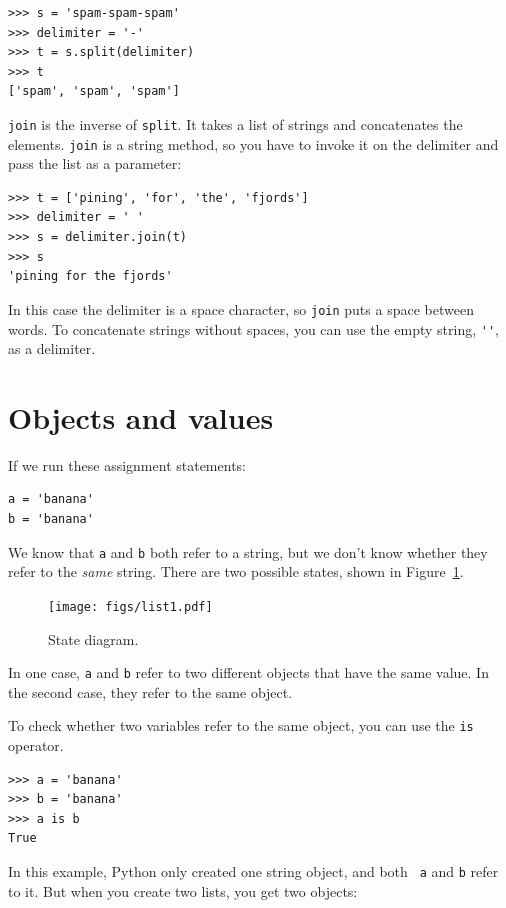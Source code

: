 \documentclass[10pt]{book}
\begin{document}
\begin{verbatim}
>>> s = 'spam-spam-spam'
>>> delimiter = '-'
>>> t = s.split(delimiter)
>>> t
['spam', 'spam', 'spam']
\end{verbatim}
%
{\tt join} is the inverse of {\tt split}.  It
takes a list of strings and
concatenates the elements.  {\tt join} is a string method,
so you have to invoke it on the delimiter and pass the
list as a parameter:

\begin{verbatim}
>>> t = ['pining', 'for', 'the', 'fjords']
>>> delimiter = ' '
>>> s = delimiter.join(t)
>>> s
'pining for the fjords'
\end{verbatim}
%
In this case the delimiter is a space character, so
{\tt join} puts a space between words.  To concatenate
strings without spaces, you can use the empty string,
\verb"''", as a delimiter.


\section{Objects and values}
\label{equivalence}

If we run these assignment statements:

\begin{verbatim}
a = 'banana'
b = 'banana'
\end{verbatim}
%
We know that {\tt a} and {\tt b} both refer to a
string, but we don't
know whether they refer to the {\em same} string.
There are two possible states, shown in Figure~\ref{fig.list1}.

\begin{figure}
\centerline
{\texttt{[image: figs/list1.pdf]}}
\caption{State diagram.}
\label{fig.list1}
\end{figure}

In one case, {\tt a} and {\tt b} refer to two different objects that
have the same value.  In the second case, they refer to the same
object.

To check whether two variables refer to the same object, you can
use the {\tt is} operator.

\begin{verbatim}
>>> a = 'banana'
>>> b = 'banana'
>>> a is b
True
\end{verbatim}
%
In this example, Python only created one string object, and both {\tt
  a} and {\tt b} refer to it.  But when you create two lists, you get
two objects:
\end{document}
